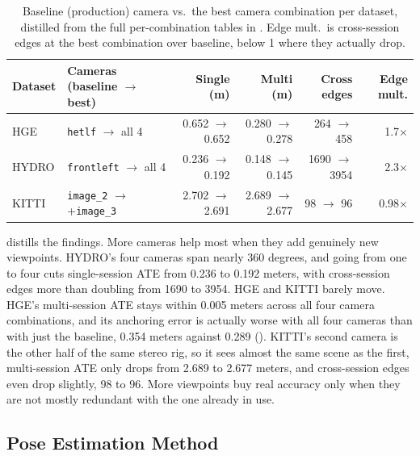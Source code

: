 \begin{table}[htb]
  \centering
  \footnotesize
  \begin{tabular*}{\textwidth}{@{\extracolsep{\fill}} llrrrr}
  \hline
  \textbf{Dataset} & \textbf{Cameras (baseline $\to$ best)} & \textbf{Single (m)} & \textbf{Multi (m)} & \textbf{Cross edges} & \textbf{Edge mult.} \\
  \hline
  HGE & \texttt{hetlf} $\to$ all 4 & 0.652 $\to$ 0.652 & 0.280 $\to$ 0.278 & 264 $\to$ 458 & 1.7$\times$ \\
  HYDRO & \texttt{frontleft} $\to$ all 4 & 0.236 $\to$ 0.192 & 0.148 $\to$ 0.145 & 1690 $\to$ 3954 & 2.3$\times$ \\
  KITTI & \texttt{image\_2} $\to$ +\texttt{image\_3} & 2.702 $\to$ 2.691 & 2.689 $\to$ 2.677 & 98 $\to$ 96 & 0.98$\times$ \\
  \hline
  \end{tabular*}
  \caption[Camera-pairing summary, baseline vs.\ best]{Baseline (production) camera vs.\ the best
    camera combination per dataset, distilled from the full per-combination tables in
    . Edge mult.\ is cross-session edges at the best
    combination over baseline, below 1 where they actually drop.}
  \label{tab:ablation-cameras-summary}
\end{table}

 distills the findings. More cameras help most when they add genuinely new viewpoints. HYDRO's four cameras span nearly 360 degrees, and going from one to four cuts single-session ATE from 0.236 to 0.192 meters, with cross-session edges more than doubling from 1690 to 3954. HGE and KITTI barely move. HGE's multi-session ATE stays within 0.005 meters across all four camera combinations, and its anchoring error is actually worse with all four cameras than with just the baseline, 0.354 meters against 0.289 (). KITTI's second camera is the other half of the same stereo rig, so it sees almost the same scene as the first, multi-session ATE only drops from 2.689 to 2.677 meters, and cross-session edges even drop slightly, 98 to 96. More viewpoints buy
real accuracy only when they are not mostly redundant with the one already in use.

\subsection{Pose Estimation Method}
\label{sec:experiments-ablation-pe}


